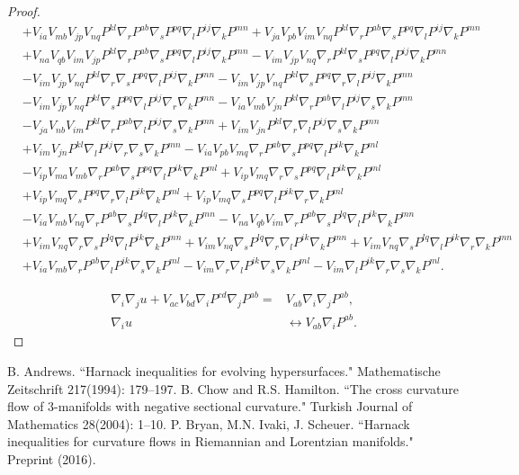 \documentclass{amsart}
\theoremstyle{definition}
\theoremstyle{remark}
\numberwithin{equation}{section}
\begin{document}
\begin{proof}
\begin{align*}
&+V_{ia}V_{mb}V_{jp}V_{nq}P^{kl}\nabla_rP^{ab}\nabla_sP^{pq}\nabla_l P^{ij}\nabla_kP^{mn}+V_{ja}V_{pb}V_{im}V_{nq}P^{kl}\nabla_rP^{ab}\nabla_sP^{pq}\nabla_l P^{ij}\nabla_kP^{mn}\\
&+V_{na}V_{qb}V_{im}V_{jp}P^{kl}\nabla_rP^{ab}\nabla_sP^{pq}\nabla_l P^{ij}\nabla_kP^{mn}-V_{im}V_{jp}V_{nq}\nabla_rP^{kl}\nabla_sP^{pq}\nabla_l P^{ij}\nabla_kP^{mn}\\
&-V_{im}V_{jp}V_{nq}P^{kl}\nabla_r\nabla_sP^{pq}\nabla_l P^{ij}\nabla_kP^{mn}-V_{im}V_{jp}V_{nq}P^{kl}\nabla_sP^{pq}\nabla_r\nabla_l P^{ij}\nabla_kP^{mn}\\
&-V_{im}V_{jp}V_{nq}P^{kl}\nabla_sP^{pq}\nabla_l P^{ij}\nabla_r\nabla_kP^{mn}-V_{ia}V_{mb}V_{jn}P^{kl}\nabla_rP^{ab}\nabla_l P^{ij}\nabla_s\nabla_kP^{mn}\\
&-V_{ja}V_{nb}V_{im}P^{kl}\nabla_rP^{ab}\nabla_l P^{ij}\nabla_s\nabla_kP^{mn}+V_{im}V_{jn}P^{kl}\nabla_r\nabla_l P^{ij}\nabla_s\nabla_kP^{mn}\\
&+V_{im}V_{jn}P^{kl}\nabla_l P^{ij}\nabla_r\nabla_s\nabla_kP^{mn}-V_{ia}V_{pb}V_{mq}\nabla_rP^{ab}\nabla_sP^{pq}\nabla_lP^{ik}\nabla_kP^{ml}\\
&-V_{ip}V_{ma}V_{mb}\nabla_rP^{ab}\nabla_sP^{pq}\nabla_lP^{ik}\nabla_kP^{ml}+V_{ip}V_{mq}\nabla_r\nabla_sP^{pq}\nabla_lP^{ik}\nabla_kP^{ml}\\
&+V_{ip}V_{mq}\nabla_sP^{pq}\nabla_r\nabla_lP^{ik}\nabla_kP^{ml}+V_{ip}V_{mq}\nabla_sP^{pq}\nabla_lP^{ik}\nabla_r\nabla_kP^{ml}\\
&-V_{ia}V_{mb}V_{nq}\nabla_rP^{ab}\nabla_sP^{lq}\nabla_lP^{ik}\nabla_kP^{mn}-V_{na}V_{qb}V_{im}\nabla_rP^{ab}\nabla_sP^{lq}\nabla_lP^{ik}\nabla_kP^{mn}\\
&+V_{im}V_{nq}\nabla_r\nabla_sP^{lq}\nabla_lP^{ik}\nabla_kP^{mn}+V_{im}V_{nq}\nabla_sP^{lq}\nabla_r\nabla_lP^{ik}\nabla_kP^{mn}+V_{im}V_{nq}\nabla_sP^{lq}\nabla_lP^{ik}\nabla_r\nabla_kP^{mn}\\
&+V_{ia}V_{mb}\nabla_rP^{ab}\nabla_lP^{ik}\nabla_s\nabla_kP^{ml}-V_{im}\nabla_r\nabla_lP^{ik}\nabla_s\nabla_kP^{ml}-V_{im}\nabla_lP^{ik}\nabla_r\nabla_s\nabla_kP^{ml}.
\end{align*}

\begin{align*}
\nabla_i\nabla_ju+V_{ac}V_{bd}\nabla_iP^{cd}\nabla_jP^{ab}=& V_{ab}\nabla_i\nabla_jP^{ab},\\
\nabla_iu&\leftrightarrow V_{ab}\nabla_iP^{ab}.
\end{align*}
\end{proof}


\begin{thebibliography}{10}
 B. Andrews. ``Harnack inequalities for evolving hypersurfaces." Mathematische Zeitschrift 217(1994): 179--197.
 B. Chow and R.S. Hamilton. ``The cross curvature flow of 3-manifolds with negative sectional curvature." Turkish Journal of Mathematics 28(2004): 1--10.
 P. Bryan, M.N. Ivaki, J. Scheuer. ``Harnack inequalities for curvature flows in Riemannian and Lorentzian manifolds." Preprint (2016).
\end{thebibliography}
\end{document}
